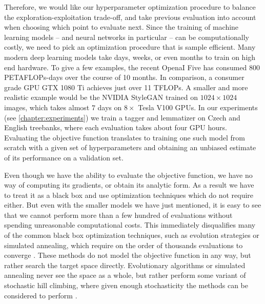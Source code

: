 Therefore, we would like our hyperparameter optimization procedure to balance the exploration-exploitation trade-off, and take previous
evaluation into account when choosing which point to evaluate next. Since the
training of machine learning models -- and neural networks in particular -- can
be computationally costly, we need to pick an optimization procedure that is
sample efficient. Many modern deep learning models take days,
weeks, or even months to train on high end hardware. To give a few examples,
the recent OpenaI Five \citep{openai-five} has consumed $800$ PETAFLOPs-days
over the course of 10 months. In comparison, a consumer grade GPU GTX 1080 Ti
achieves just over 11 TFLOPs. A smaller and more realistic example would be the
NVIDIA StyleGAN \citep{nvidia-stylegan} trained on $1024\times1024$ images,
which takes almost $7$ days on $8\times$ Tesla V100 GPUs. In our experiments (see
\autoref{chapter:experiments}) we train a tagger and lemmatizer on Czech and
English treebanks, where each evaluation takes about four GPU hours. Evaluating
the objective function translates to training one such model from scratch with a
given set of hyperparameters and obtaining an unbiased estimate of its performance
on a validation set.

Even though we have the ability to evaluate the objective function, we have no
way of computing its gradients, or obtain its analytic form. As a result we
have to treat it as a black box and use optimization techniques which do not
require either. But even with the smaller models we have just mentioned, it is easy
to see that we cannot perform more than a few hundred of evaluations without
spending unreasonable computational costs. This immediately
disqualifies many of the common black box optimization techniques, such as
evolution strategies or simulated annealing, which require on the order of
thousands evaluations to converge \citep{google-vizier}. These methods do not model the objective function in any way, but rather search the target space directly. Evolutionary algorithms or simulated annealing never see the space as a whole, but rather perform some variant of stochastic hill climbing, where given enough stochasticity the methods can be considered to perform .

